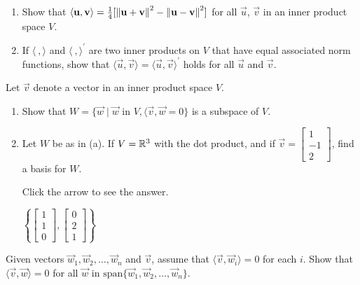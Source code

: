 \documentclass{ximera}
\begin{document}
\begin{problem}\label{prob:inner_prod_25}
\begin{enumerate} 
\item Show that $\langle \mathbf{u}, \mathbf{v} \rangle = \frac{1}{4}[\left\lVert \mathbf{u} + \mathbf{v} \right\rVert ^2 - \left\lVert \mathbf{u} - \mathbf{v} \right\rVert ^2]$ for all $\vec{u}$, $\vec{v}$ in an inner product space $V$.

\item If $\langle\ , \rangle$ and $\langle\ , \rangle^\prime$ are two inner products on $V$ that have equal associated norm functions, show that $\langle\vec{u}, \vec{v}\rangle = \langle\vec{u}, \vec{v}\rangle^\prime$ holds for all $\vec{u}$ and $\vec{v}$.

\end{enumerate}
\end{problem}

\begin{problem}\label{prob:inner_prod_26}
Let $\vec{v}$ denote a vector in an inner product space $V$.

\begin{enumerate} 
\item Show that $W = \{\vec{w} \mid \vec{w} \mbox{ in } V, \langle\vec{v}, \vec{w} = 0\}$ is a subspace of $V$.

\item Let $W$ be as in (a). If $V = \mathbb{R}^3$ with the dot product, and if $\vec{v} = \begin{bmatrix}1\\ -1\\ 2\end{bmatrix}$, find a basis for $W$.

Click the arrow to see the answer.
\begin{expandable}{}{}
$\left\{\begin{bmatrix}1\\ 1\\ 0\end{bmatrix}, \begin{bmatrix}0\\ 2\\ 1\end{bmatrix}\right\}$
\end{expandable}
\end{enumerate}
\end{problem}

\begin{problem} \label{ex:10_1_27}
Given vectors $\vec{w}_{1}, \vec{w}_{2}, \dots, \vec{w}_{n}$ and $\vec{v}$, assume that $\langle\vec{v}, \vec{w}_{i}\rangle = 0$ for each $i$. Show that $\langle\vec{v}, \vec{w}\rangle = 0$ for all $\vec{w}$ in $\mbox{span}\{\vec{w}_{1}, \vec{w}_{2}, \dots, \vec{w}_{n}\}$.
\end{problem}
\end{document}
